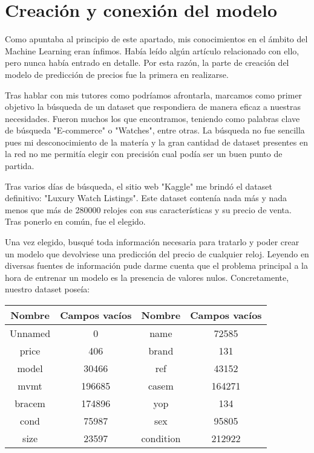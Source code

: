 \section{Creación y conexión del modelo}
	
	Como apuntaba al principio de este apartado, mis conocimientos en el ámbito del Machine Learning eran ínfimos. Había leído algún artículo relacionado con ello, pero nunca había entrado en detalle. Por esta razón, la parte de creación del modelo de predicción de precios fue la primera en realizarse. 
	
	Tras hablar con mis tutores como podríamos afrontarla, marcamos como primer objetivo la búsqueda de un dataset que respondiera de manera eficaz a nuestras necesidades. Fueron muchos los que encontramos, teniendo como palabras clave de búsqueda "E-commerce" o "Watches", entre otras. La búsqueda no fue sencilla pues mi desconocimiento de la matería y la gran cantidad de dataset presentes en la red no me permitía elegir con precisión cual podía ser un buen punto de partida.
	
	Tras varios días de búsqueda, el sitio web "Kaggle" me brindó el dataset definitivo: "Luxury Watch Listings". Este dataset contenía nada más y nada menos que más de 280000 relojes con sus características y su precio de venta. Tras ponerlo en común, fue el elegido.
	
	Una vez elegido, busqué toda información necesaria para tratarlo y poder crear un modelo que devolviese una predicción del precio de cualquier reloj. Leyendo en diversas fuentes de información pude darme cuenta que el problema principal a la hora de entrenar un modelo es la presencia de valores nulos. Concretamente, nuestro dataset poseía:

	\begin{tabular}{|c|c|c|c|}
  		\hline
  		Nombre & Campos vacíos & Nombre & Campos vacíos \\
  		\hline
  		Unnamed & 0 & name & 72585 \\
  		\hline
  		price & 406 & brand & 131 \\
  		\hline
  		model & 30466 & ref & 43152 \\
  		\hline
  		mvmt & 196685 & casem & 164271 \\
  		\hline
  		bracem & 174896 & yop & 134 \\
  		\hline
  		cond & 75987 & sex & 95805 \\
  		\hline
  		size & 23597 & condition & 212922 \\
  		\hline
	\end{tabular}
	
